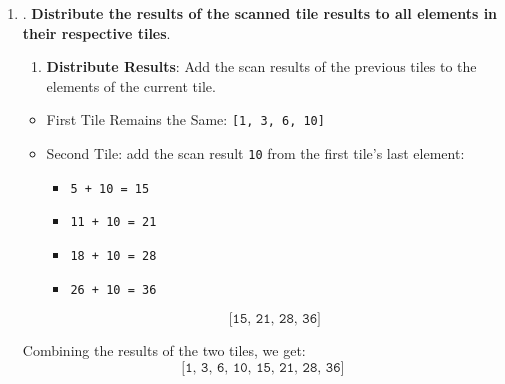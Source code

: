 \begin{itemize}
\begin{itemize}
\begin{enumerate}
            \item {}. \textbf{Distribute the results of the scanned tile results to all elements in their respective tiles}.
            \begin{enumerate}
                \item \textbf{Distribute Results}: Add the scan results of the previous tiles to the elements of the current tile.
            \end{enumerate}
            \begin{examplebox}
                \begin{itemize}
                    \item First Tile Remains the Same: \texttt{[1, 3, 6, 10]}
                    \item Second Tile: add the scan result \texttt{10} from the first tile's last element:
                    \begin{itemize}
                        \item \texttt{5 + 10 = 15}
                        \item \texttt{11 + 10 = 21}
                        \item \texttt{18 + 10 = 28}
                        \item \texttt{26 + 10 = 36}
                    \end{itemize}
                    \begin{equation*}
                        \texttt{[15, 21, 28, 36]}
                    \end{equation*}
                \end{itemize}
                Combining the results of the two tiles, we get:
                \begin{equation*}
                    \texttt{[1, 3, 6, 10, 15, 21, 28, 36]}
                \end{equation*}
            \end{examplebox}
        \end{enumerate}
    \end{itemize}
    \begin{figure}[!htp]
        \centering

\end{figure}
\end{itemize}
